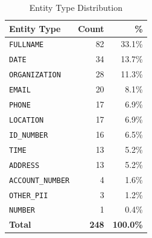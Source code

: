 \begin{table}[h]
\centering
\caption{Entity Type Distribution}
\label{tab:entity-distribution}
\begin{tabular}{lrr}
\toprule
\textbf{Entity Type} & \textbf{Count} & \textbf{\%} \\
\midrule
\texttt{FULLNAME} & 82 & 33.1\% \\
\texttt{DATE} & 34 & 13.7\% \\
\texttt{ORGANIZATION} & 28 & 11.3\% \\
\texttt{EMAIL} & 20 & 8.1\% \\
\texttt{PHONE} & 17 & 6.9\% \\
\texttt{LOCATION} & 17 & 6.9\% \\
\texttt{ID_NUMBER} & 16 & 6.5\% \\
\texttt{TIME} & 13 & 5.2\% \\
\texttt{ADDRESS} & 13 & 5.2\% \\
\texttt{ACCOUNT_NUMBER} & 4 & 1.6\% \\
\texttt{OTHER_PII} & 3 & 1.2\% \\
\texttt{NUMBER} & 1 & 0.4\% \\
\midrule
\textbf{Total} & \textbf{248} & \textbf{100.0\%} \\
\bottomrule
\end{tabular}
\end{table}